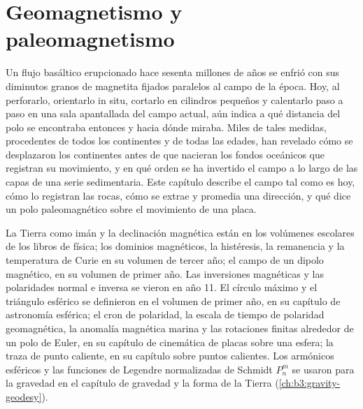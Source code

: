 \chapter{Geomagnetismo y paleomagnetismo}\label{ch:b3:palaeomagnetism}

Un flujo basáltico erupcionado hace sesenta millones de años se enfrió con sus diminutos granos de
magnetita fijados paralelos al campo de la época. Hoy, al perforarlo, orientarlo in
situ, cortarlo en cilindros pequeños y calentarlo
paso a paso en una sala apantallada del campo actual, aún indica a qué distancia
del polo se encontraba entonces y hacia dónde miraba. Miles de tales
medidas, procedentes de todos los continentes y de todas las edades, han revelado cómo
se desplazaron los continentes antes de que nacieran los fondos oceánicos que registran su movimiento, y en
qué orden se ha invertido el campo a lo largo de las capas de una serie
sedimentaria. Este capítulo describe el campo tal como es hoy, cómo lo registran las rocas,
cómo se extrae y promedia una dirección, y qué dice un polo paleomagnético
sobre el movimiento de una placa.

\begin{recall}
La Tierra como imán y la declinación magnética están en los volúmenes escolares de los
libros de física; los dominios magnéticos, la histéresis, la remanencia y la
temperatura de Curie en su volumen de tercer año; el campo de un dipolo magnético, en su
volumen de primer año. Las inversiones magnéticas y las polaridades normal e inversa se
vieron en año 11. El círculo máximo y el triángulo esférico se definieron en
el volumen de primer año, en su capítulo de astronomía esférica; el cron de polaridad,
la escala de tiempo de polaridad geomagnética, la anomalía magnética marina y las rotaciones finitas
alrededor de un polo de Euler, en su capítulo de cinemática de placas sobre una esfera;
la traza de punto caliente, en su capítulo sobre puntos calientes. Los armónicos esféricos y
las funciones de Legendre normalizadas de Schmidt $P_n^m$ se usaron para la gravedad en
el capítulo de gravedad y la forma de la Tierra (\cref{ch:b3:gravity-geodesy}).
\end{recall}

